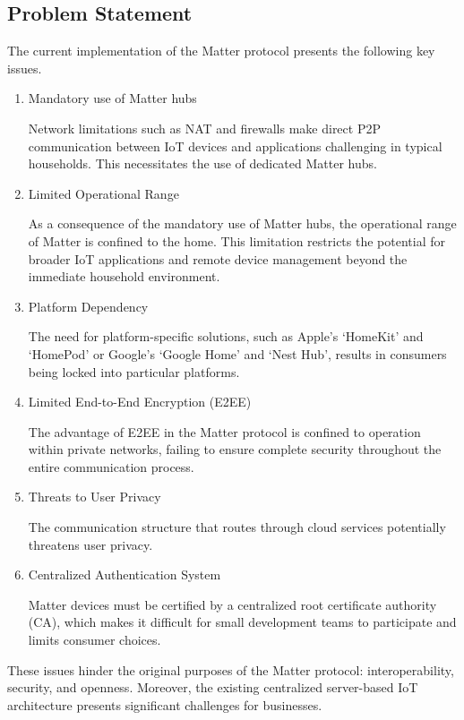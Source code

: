 \documentclass[conference]{IEEEtran}
\begin{document}
	\subsection{Problem Statement}
	The current implementation of the Matter protocol presents the following key
	issues.
	\begin{enumerate}[itemsep=2ex, parsep=1ex]
		\item Mandatory use of Matter hubs

			Network limitations such as NAT and firewalls make direct P2P
			communication between IoT devices and applications challenging in typical
			households. This necessitates the use of dedicated Matter hubs.

		\item Limited Operational Range

			As a consequence of the mandatory use of Matter hubs, the operational range
			of Matter is confined to the home. This limitation restricts the potential
			for broader IoT applications and remote device management beyond the
			immediate household environment.

		\item Platform Dependency

			The need for platform-specific solutions, such as Apple's `HomeKit' and `HomePod'
			or Google's `Google Home' and `Nest Hub', results in consumers being
			locked into particular platforms.

		\item Limited End-to-End Encryption (E2EE)

			The advantage of E2EE in the Matter protocol is confined to operation
			within private networks, failing to ensure complete security throughout the
			entire communication process.

		\item Threats to User Privacy

			The communication structure that routes through cloud services potentially
			threatens user privacy.

		\item Centralized Authentication System

			Matter devices must be certified by a centralized root certificate
			authority (CA), which makes it difficult for small development teams to participate
			and limits consumer choices.
	\end{enumerate}

	These issues hinder the original purposes of the Matter protocol: interoperability,
	security, and openness. Moreover, the existing centralized server-based IoT architecture
	presents significant challenges for businesses.
\end{document}

